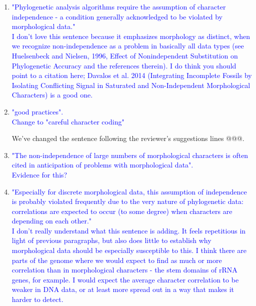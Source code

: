 \documentclass[12pt,letterpaper]{article}
\begin{document}
\begin{enumerate}

\item{\textcolor{blue}{"Phylogenetic analysis algorithms require the assumption of character independence - a condition generally acknowledged to be violated by morphological data."\\
I don't love this sentence because it emphasizes morphology as distinct, when we recognize non-independence as a problem in basically all data types (see Huelsenbeck and Nielsen, 1996, Effect of Nonindependent Substitution on Phylogenetic Accuracy and the references therein). I do think you should point to a citation here; Davalos et al. 2014 (Integrating Incomplete Fossils by Isolating Conflicting Signal in Saturated and Non-Independent Morphological Characters) is a good one.}}


\item{\textcolor{blue}{"good practices".\\
Change to "careful character coding"}}

We've changed the sentence following the reviewer's suggestions lines @@@.

\item{\textcolor{blue}{"The non-independence of large numbers of morphological characters is often cited in anticipation of problems with morphological data".\\
Evidence for this?}}


\item{\textcolor{blue}{"Especially for discrete morphological data, this assumption of independence is probably violated frequently due to the very nature of phylogenetic data: correlations are expected to occur (to some degree) when characters are depending on each other."\\
I don't really understand what this sentence is adding. It feels repetitious in light of previous paragraphs, but also does little to establish why morphological data should be especially susceptible to this. I think there are parts of the genome where we would expect to find as much or more correlation than in morphological characters - the stem domains of rRNA genes, for example. I would expect the average character correlation to be weaker in DNA data, or at least more spread out in a way that makes it harder to detect.}}



\end{enumerate}
\end{document}
